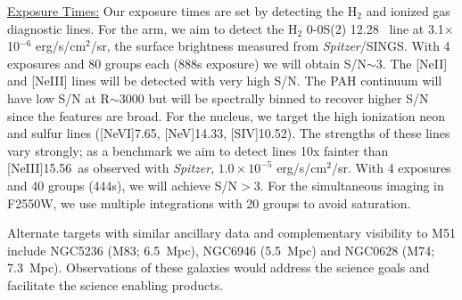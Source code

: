 \documentclass[12pt]{article}
\begin{document}
\noindent \underline{Exposure Times:} Our exposure times are set by detecting the H$_2$ and ionized gas diagnostic lines.  For the arm, we aim to detect the H$_2$ 0-0S(2) 12.28 \micron\ line at 3.1$\times$10$^{-6}$ erg/s/cm$^2$/sr, the surface brightness measured from {\em Spitzer}/SINGS. With 4 exposures and 80 groups each (888s exposure) we will obtain S/N$\sim$3.  The [Ne{\small II}] and [Ne{\small III}] lines will be detected with very high S/N. The PAH continuum will have low S/N at R$\sim$3000 but will be spectrally binned to recover higher S/N since the features are broad.   For the nucleus, we target the high ionization neon and sulfur lines ([Ne{\small VI}]7.65\micron, [Ne{\small V}]14.33\micron, [S{\small IV}]10.52\micron).  The strengths of these lines vary strongly; as a benchmark we aim to detect lines 10x fainter than [Ne{\small III}]15.56\micron\ as observed with {\em Spitzer}, $1.0{\times}10^{-5}$ erg/s/cm$^2$/sr. With 4 exposures and 40 groups (444s), we will achieve S/N$>$3.  For the simultaneous imaging in F2550W, we use multiple integrations with 20 groups to avoid saturation.


\vspace{-0.1in}
%

\alttargets   %
\vspace{-0.15in}
Alternate targets with similar ancillary data and complementary visibility to M51 include NGC5236 (M83; 6.5~Mpc), NGC6946 (5.5~Mpc) and NGC0628 (M74; 7.3~Mpc). Observations of these galaxies would address the science goals and facilitate the science enabling products. %


%
\vspace{-0.1in}
\end{document}
